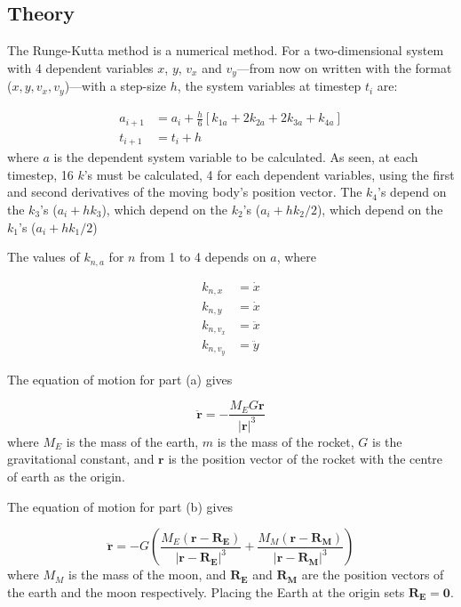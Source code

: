 \documentclass[hyphens,twocolumn,nobalancelastpage,aps,10pt,citeautoscript,longbibliography]{revtex4-2}
\begin{document}
\subsection{Theory}%
\label{sub:theory_1}

\noindent The Runge-Kutta method is a numerical method. For a two-dimensional
system with 4 dependent variables $x$, $y$, $v_x$ and $v_y$---from now on written with the format ($x, y, v_x, v_y$)---with a step-size $h$, the
system variables at timestep $t_i$ are:

\begin{equation}
	\label{eq:timestepping}%
	\begin{split}
		a_{i+1}   & = a_i + \frac{h}{6}\left[k_{1a}+2k_{2a}+2k_{3a}+k_{4a}\right] \\
		t_{i+1} &= t_i + h
	\end{split}
\end{equation}
where $a$ is the dependent system variable to be calculated. As seen, at each
timestep, 16 $k$'s must be calculated, 4 for each dependent variables, using
the first and second derivatives of the moving body's position vector. The
$k_4$'s depend on the $k_3$'s ($a_i + hk_{3}$), which depend on the $k_2$'s ($a_i +
	hk_{2}/2$), which depend on the $k_1$'s ($a_i + hk_{1}/2$)

The values of $k_{n,a}$ for $n$ from 1 to 4 depends on $a$, where

\begin{equation}
	\label{eq:k_equations}%
	\begin{split}
		k_{n,x} &= \dot{x}\\
		k_{n,y} &= \dot{x}\\
		k_{n,v_{x}} &= \ddot{x}\\
		k_{n,v_{y}} &= \ddot{y}
	\end{split}
\end{equation}

The equation of motion for part (a) gives

\begin{equation}
	\label{eq:part_a}%
	\ddot{\mathbf{r}} = - \frac{M_EG\mathbf{r}}{{\left|\mathbf{r}\right|}^3}
\end{equation}
where $M_E$ is the mass of the earth, $m$ is the mass of the rocket, $G$ is the
gravitational constant, and $\mathbf{r}$ is the position vector of the rocket
with the centre of earth as the origin.

The equation of motion for part (b) gives

\begin{equation}
	\label{eq:part_b}%
	\ddot{\mathbf{r}} = - G\left(\frac{M_E\left(\mathbf{r} - \mathbf{R_E}\right)}{{\left|\mathbf{r} - \mathbf{R_E}\right|}^3} + \frac{M_M\left(\mathbf{r} - \mathbf{R_M}\right)}{{\left|\mathbf{r} - \mathbf{R_M}\right|}^3}\right)
\end{equation}
where $M_M$ is the mass of the moon, and $\mathbf{R_E}$ and $\mathbf{R_M}$ are
the position vectors of the earth and the moon respectively. Placing the Earth
at the origin sets $\mathbf{R_E = 0}$.
\end{document}
